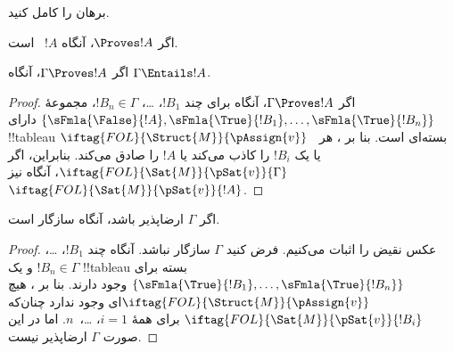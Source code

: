 \documentclass[../../../include/open-logic-section]{subfiles}
\begin{document}
\begin{prob}
برهان  را کامل کنید.
\end{prob}
\tagendprob

\begin{cor}
اگر $\Proves !A$، آنگاه $!A$~ است.
\end{cor}

\begin{cor}
اگر $\Gamma \Proves !A$، آنگاه $\Gamma \Entails !A$.
\end{cor}

\begin{proof}
  اگر $\Gamma \Proves !A$، آنگاه برای چند $!B_1$، \dots،
  $!B_n \in \Gamma$، مجموعهٔ $\{\sFmla{\False}{!A},
  \sFmla{\True}{!B_1}, \dots, \sFmla{\True}{!B_n}\}$ دارای
  !!{tableau} بسته‌ای است. بنا بر
  ، هر
  ~$\iftag{FOL}{\Struct{M}}{\pAssign{v}}$
  یا یک $!B_i$ را کاذب می‌کند یا $!A$ را صادق می‌کند. بنابراین، اگر
  $\iftag{FOL}{\Sat{M}}{\pSat{v}}{\Gamma}$، آنگاه نیز
  $\iftag{FOL}{\Sat{M}}{\pSat{v}}{!A}$.
\end{proof}

\begin{cor}
اگر $\Gamma$ ارضاپذیر باشد، آنگاه سازگار است.
\end{cor}

\begin{proof}
عکس نقیض را اثبات می‌کنیم. فرض کنید $\Gamma$ سازگار نباشد. آنگاه چند
$!B_1$، \dots، $!B_n \in \Gamma$ و یک !!{tableau} بسته برای
$\{\sFmla{\True}{!B_1}, \dots, \sFmla{\True}{!B_n}\}$ وجود دارند. بنا بر
، هیچ
$\iftag{FOL}{\Struct{M}}{\pAssign{v}}$ای وجود ندارد چنان‌که
$\iftag{FOL}{\Sat{M}}{\pSat{v}}{!B_i}$ برای همهٔ $i=1$، \dots،~$n$.
اما در این
صورت $\Gamma$ ارضاپذیر نیست.
\end{proof}
\end{document}
